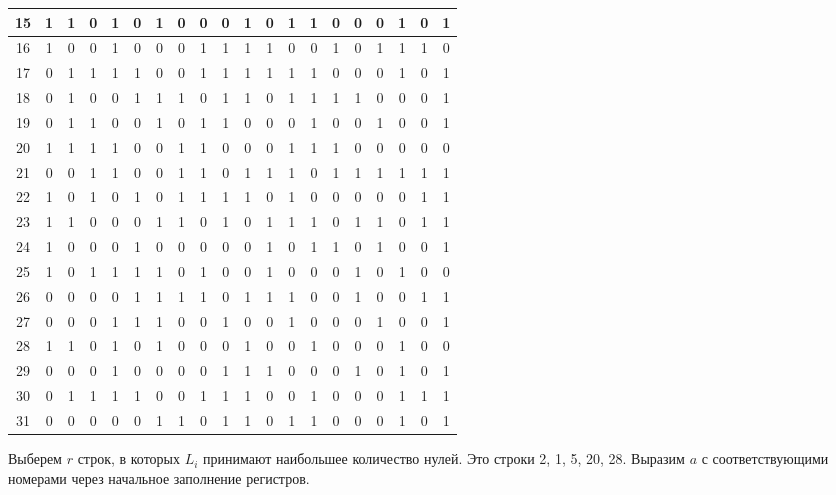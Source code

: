 \begin{adjustbox}{center}
\begin{tabular}{||c|c|c|c|c|c|c|c|c|c|c|c|c|c|c|c|c|c|c|c||}
\hline
15 & 1 & 1 & 0 & 1 & 0 & 1 & 0 & 0 & 0 & 1 & 0 & 1 & 1 & 0 & 0 & 0 & 1 & 0 & 1 \\
\hline
16 & 1 & 0 & 0 & 1 & 0 & 0 & 0 & 1 & 1 & 1 & 1 & 0 & 0 & 1 & 0 & 1 & 1 & 1 & 0 \\
\hline
17 & 0 & 1 & 1 & 1 & 1 & 0 & 0 & 1 & 1 & 1 & 1 & 1 & 1 & 0 & 0 & 0 & 1 & 0 & 1 \\
\hline
18 & 0 & 1 & 0 & 0 & 1 & 1 & 1 & 0 & 1 & 1 & 0 & 1 & 1 & 1 & 1 & 0 & 0 & 0 & 1 \\
\hline
19 & 0 & 1 & 1 & 0 & 0 & 1 & 0 & 1 & 1 & 0 & 0 & 0 & 1 & 0 & 0 & 1 & 0 & 0 & 1 \\
\hline
20 & 1 & 1 & 1 & 1 & 0 & 0 & 1 & 1 & 0 & 0 & 0 & 1 & 1 & 1 & 0 & 0 & 0 & 0 & 0 \\
\hline
21 & 0 & 0 & 1 & 1 & 0 & 0 & 1 & 1 & 0 & 1 & 1 & 1 & 0 & 1 & 1 & 1 & 1 & 1 & 1 \\
\hline
22 & 1 & 0 & 1 & 0 & 1 & 0 & 1 & 1 & 1 & 1 & 0 & 1 & 0 & 0 & 0 & 0 & 0 & 1 & 1 \\
\hline
23 & 1 & 1 & 0 & 0 & 0 & 1 & 1 & 0 & 1 & 0 & 1 & 1 & 1 & 0 & 1 & 1 & 0 & 1 & 1 \\
\hline
24 & 1 & 0 & 0 & 0 & 1 & 0 & 0 & 0 & 0 & 0 & 1 & 0 & 1 & 1 & 0 & 1 & 0 & 0 & 1 \\
\hline
25 & 1 & 0 & 1 & 1 & 1 & 1 & 0 & 1 & 0 & 0 & 1 & 0 & 0 & 0 & 1 & 0 & 1 & 0 & 0 \\
\hline
26 & 0 & 0 & 0 & 0 & 1 & 1 & 1 & 1 & 0 & 1 & 1 & 1 & 0 & 0 & 1 & 0 & 0 & 1 & 1 \\
\hline
27 & 0 & 0 & 0 & 1 & 1 & 1 & 0 & 0 & 1 & 0 & 0 & 1 & 0 & 0 & 0 & 1 & 0 & 0 & 1 \\
\hline
28 & 1 & 1 & 0 & 1 & 0 & 1 & 0 & 0 & 0 & 1 & 0 & 0 & 1 & 0 & 0 & 0 & 1 & 0 & 0 \\
\hline
29 & 0 & 0 & 0 & 1 & 0 & 0 & 0 & 0 & 1 & 1 & 1 & 0 & 0 & 0 & 1 & 0 & 1 & 0 & 1 \\
\hline
30 & 0 & 1 & 1 & 1 & 1 & 0 & 0 & 1 & 1 & 1 & 0 & 0 & 1 & 0 & 0 & 0 & 1 & 1 & 1 \\
\hline
31 & 0 & 0 & 0 & 0 & 0 & 1 & 1 & 0 & 1 & 1 & 0 & 1 & 1 & 0 & 0 & 0 & 1 & 0 & 1 \\
\hline
\end{tabular}
\end{adjustbox}

\medskip

Выберем $r$ строк, в которых $L_i$ принимают наибольшее количество нулей. Это строки 2, 1, 5, 20, 28. Выразим $a$ с соответствующими номерами через начальное заполнение регистров.

